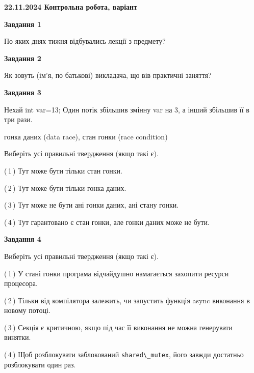 \documentclass[12pt, ukrainian]{article}
\def\code#1{\Verb!#1!}
\begin{document}
\begin {large}

\textbf{22.11.2024 Контрольна робота, варіант  }\par


{

\begin{center}
\textbf{Завдання 1}
\end{center}

По яких днях тижня відбувались лекції з предмету?


\begin{center}
\textbf{Завдання 2}
\end{center}

Як зовуть (ім'я, по батькові) викладача, що вів практичні заняття?


\begin{center}
\textbf{Завдання 3}
\end{center}

Нехай int var=13; Один потік збільшив змінну var на 3, а інший збільшив її в три рази.

гонка даних (data race), стан гонки (race condition)

Виберіть усі правильні твердження (якщо такі є).\par
\vspace{2mm}
(\,1\,) Тут може бути тільки стан гонки.%

(\,2\,) Тут може бути тільки гонка даних.%

(\,3\,) Тут може не бути ані гонки даних, ані стану гонки.%

(\,4\,) Тут гарантовано є стан гонки, але гонки даних може не бути.%


\begin{center}
\textbf{Завдання 4}
\end{center}

Виберіть усі правильні твердження (якщо такі є).\par
\vspace{2mm}

(\,1\,) У стані гонки програма відчайдушно намагається захопити ресурси процесора.%

(\,2\,) Тільки від компілятора залежить, чи запустить функція async виконання в новому потоці.%

(\,3\,) Секція є критичною, якщо під час її виконання не можна генерувати винятки.%

(\,4\,) Щоб розблокувати заблокований \code{shared\_mutex}, його завжди достатньо розблокувати один раз.%


}
\end{large}
\end{document}
